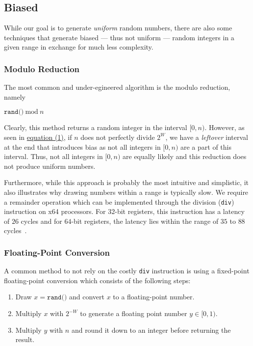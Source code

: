 \documentclass[a4paper, UKenglish, cleveref, autoref, thm-restate]{lipics-v2021}
\newcommand{\Mod}[1]{\ \mathrm{mod}\ #1}
\begin{document}
\subsection{Biased}
While our goal is to generate \emph{uniform} random numbers, there are also some techniques that generate biased --- thus not uniform --- random integers in a given range in exchange for much less complexity.

\subsubsection{Modulo Reduction}\label{sec:2.1.1}
The most common and under-egineered algorithm is the modulo reduction, namely
\begin{center}
    $\texttt{rand()} \Mod n$
\end{center}
Clearly, this method returns a random integer in the interval $[0,n)$.
However, as seen in \hyperref[eq:1]{equation (1)}, if $n$ does not perfectly divide $2^W$, we have a \emph{leftover} interval at the end that introduces bias as not all integers in $[0,n)$ are a part of this interval.
Thus, not all integers in $[0,n)$ are equally likely and this reduction does not produce uniform numbers.

Furthermore, while this approach is probably the most intuitive and simplistic, it also illustrates why drawing numbers within a range is typically slow.
We require a remainder operation which can be implemented through the division (\texttt{div}) instruction on x64 processors.
For $32$-bit registers, this instruction has a latency of $26$ cycles and for $64$-bit registers, the latency lies within the range of $35$ to $88$ cycles~\cite{Instructions}.


\subsubsection{Floating-Point Conversion}\label{sec:2.1.2}
A common method to not rely on the costly \texttt{div} instruction is using a fixed-point floating-point conversion which consists of the following steps:
\begin{enumerate}
    \item Draw $x = \texttt{rand()}$ and convert $x$ to a floating-point number.
    \item Multiply $x$ with $2^{-W}$ to generate a floating point number $y \in [0,1)$.
    \item Multiply $y$ with $n$ and round it down to an integer before returning the result.
\end{enumerate}
\end{document}
